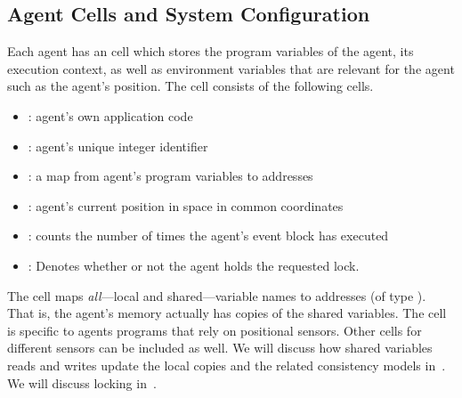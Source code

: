  


\subsection{Agent Cells and System Configuration}
%
Each agent has an  cell which stores the program variables of the agent, its execution context, as well as environment variables that are relevant for the agent such as the agent's position.  The  cell consists of the following cells.
%
\begin{itemize}
 \item  {}: agent's own application code
 \item {}: agent's unique integer identifier 
 \item {}: a map from agent's program variables to addresses
 \item  {}: agent's current position in space in common coordinates 
 \item  {}: counts the number of times the agent's event block has executed
 \item {}: Denotes whether or not the agent holds the requested lock.
\end{itemize}

%
The  cell maps  \emph{all}---local and shared---variable names to addresses (of type ). That is,  the agent's memory actually has copies of the shared variables.
The  cell is specific to agents programs that rely on positional sensors. Other cells for different sensors can be included as well. 
We will discuss how shared variables reads and writes update the local copies and the related consistency models in~. 
We will discuss locking in~. 

